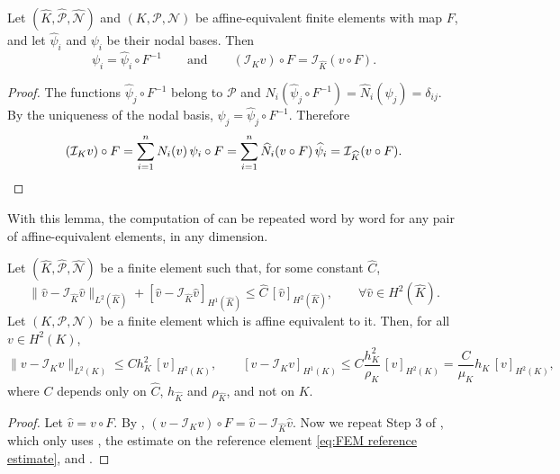\begin{lemma}
    \label{lem:FEM interpolation commutes}
    Let $(\widehat K, \widehat{\mathcal P}, \widehat{\mathcal N})$ and $(K, \mathcal P, \mathcal N)$ be affine-equivalent finite elements with map $F$, and let $\widehat \psi_i$ and $\psi_i$ be their nodal bases. Then
    \begin{equation*}
        \psi_i = \widehat \psi_i \circ F^{-1}
        \qquad \text{and} \qquad
        (\mathcal I_K v) \circ F = \mathcal I_{\widehat K} (v \circ F).
    \end{equation*}
\end{lemma}
\begin{proof}
    The functions $\widehat \psi_j \circ F^{-1}$ belong to $\mathcal P$ and $N_i (\widehat \psi_j \circ F^{-1}) = \widehat N_i (\widehat \psi_j) = \delta_{ij}$. By the uniqueness of the nodal basis, $\psi_j = \widehat \psi_j \circ F^{-1}$. Therefore
    \begin{equation*}
        (\mathcal I_K v) \circ F = \sum_{i=1}^n N_i(v)\, \psi_i \circ F = \sum_{i=1}^n \widehat N_i (v \circ F)\, \widehat \psi_i = \mathcal I_{\widehat K} (v \circ F). \qedhere
    \end{equation*}
\end{proof}

With this lemma, the computation of  can be repeated word by word for any pair of affine-equivalent elements, in any dimension.
\begin{strongtheorem}
    \label{thm:FEM local interpolation error}
    Let $(\widehat K, \widehat{\mathcal P}, \widehat{\mathcal N})$ be a finite element such that, for some constant $\widehat C$,
    \begin{equation}
        \label{eq:FEM reference estimate}
        \| \widehat v - \mathcal I_{\widehat K} \widehat v \|_{L^2(\widehat K)} + [ \widehat v - \mathcal I_{\widehat K} \widehat v ]_{H^1(\widehat K)} \le \widehat C\, [ \widehat v ]_{H^2(\widehat K)},
        \qquad \forall \widehat v \in H^2(\widehat K).
    \end{equation}
    Let $(K, \mathcal P, \mathcal N)$ be a finite element which is affine equivalent to it. Then, for all $v \in H^2(K)$,
    \begin{equation*}
        \| v - \mathcal I_K v \|_{L^2(K)} \le C h_K^2\, [ v ]_{H^2(K)},
        \qquad
        [ v - \mathcal I_K v ]_{H^1(K)} \le C \frac{h_K^2}{\rho_K}\, [ v ]_{H^2(K)} = \frac{C}{\mu_K} h_K\, [ v ]_{H^2(K)},
    \end{equation*}
    where $C$ depends only on $\widehat C$, $h_{\widehat K}$ and $\rho_{\widehat K}$, and not on $K$.
\end{strongtheorem}
\begin{proof}
    Let $\widehat v = v \circ F$. By , $(v - \mathcal I_K v) \circ F = \widehat v - \mathcal I_{\widehat K} \widehat v$.
    Now we repeat Step 3 of , which only uses , the estimate on the reference element \eqref{eq:FEM reference estimate}, and .
\end{proof}

